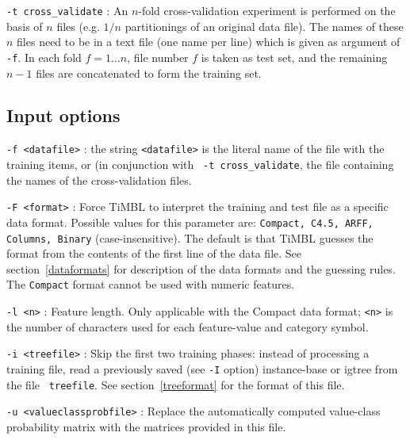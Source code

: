 \documentclass{report}
\begin{document}
\begin{description}
\item {\tt -t cross\_validate} : An $n$-fold cross-validation
experiment is performed on the basis of $n$ files (e.g. $1/n$
partitionings of an original data file). The names of these $n$ files
need to be in a text file (one name per line) which is given as
argument of {\tt -f}. In each fold $f=1 \ldots n$, file number $f$ is
taken as test set, and the remaining $n-1$ files are concatenated to
form the training set.

\end{description}

\subsection{Input options}

\begin{description}

\item {\tt -f <datafile>} : the string {\tt <datafile>} is the literal
name of the file with the training items, or (in conjunction with {\tt
-t cross\_validate}, the file containing the names of the
cross-validation files.

\item {\tt -F <format>} : Force TiMBL to interpret the training and
test file as a specific data format. Possible values for this
parameter are: {\tt Compact, C4.5, ARFF, Columns, Binary}
(case-insensitive). The default is that TiMBL guesses the format from
the contents of the first line of the data file. See
section~\ref{dataformats} for description of the data formats and the
guessing rules. The {\tt Compact} format cannot be used with numeric
features.

\item {\tt -l <n>} : Feature length. Only applicable with the Compact
data format; {\tt <n>} is the number of characters used for each
feature-value and category symbol.

\item {\tt -i <treefile>} : Skip the first two training phases:
instead of processing a training file, read a previously saved (see
{\tt -I} option) instance-base or {\sc igtree} from the file {\tt
treefile}. See section~\ref{treeformat} for the format of this file.

\item {\tt -u <valueclassprobfile>} : Replace the automatically computed
value-class probability matrix with the matrices provided in this
file.


\end{description}
\end{document}
